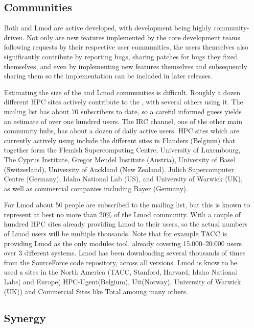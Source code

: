 \subsection{Communities}

Both \easybuild{} and Lmod are active developed, with development being
highly community-driven. Not only are new features implemented by the core
development teams following requests by their respective user communities, the
users themselves also significantly contribute by reporting bugs, sharing patches
for bugs they fixed themselves, and even by implementing new features themselves
and subsequently sharing them so the implementation can be included in later
releases.

Estimating the size of the \easybuild{} and Lmod communities is difficult.
Roughly a dozen different HPC sites actively contribute to the \easybuild{}, with
several others using it. The \easybuild{} mailing list has about 70 subscribers
to date, so a careful informed guess yields an estimate of over one hundred
users. The \easybuild{} IRC channel, one of the other main community hubs, has
about a dozen of daily active users. HPC sites which are currently actively using
\easybuild{} include the different sites in Flanders (Belgium) that together form
the Flemish Supercomputing Centre, University of Luxembourg, The Cyprus Institute,
Gregor Mendel Institute (Austria), University of Basel (Switzerland), University
of Auckland (New Zealand), J\"ulich Supercomputer Centre (Germany), Idaho
National Lab (US), and University of Warwick (UK), as well as commercial
companies including Bayer (Germany).

For Lmod about 50 people are subscribed to the mailing list, but this
is known to represent at best no more than $20\%$ of the Lmod community. With a
couple of hundred HPC sites already providing Lmod to their users, so the actual
numbers of Lmod users will be multiple thousands. Note that for example TACC is
providing Lmod as the only modules tool, already covering 15.000--20.000 users
over 3 different systems. Lmod has been downloading several thousands of times
from the SourceForce code repository, across all versions.
Lmod is know to be used a sites in the North America (TACC, Stanford, Harvard,
Idaho National Labs) and Europe( HPC-Ugent(Belgium), Uit(Norway),
University of Warwick (UK)) and Commercial Sites like Total amoung
many others.

\subsection{Synergy}

